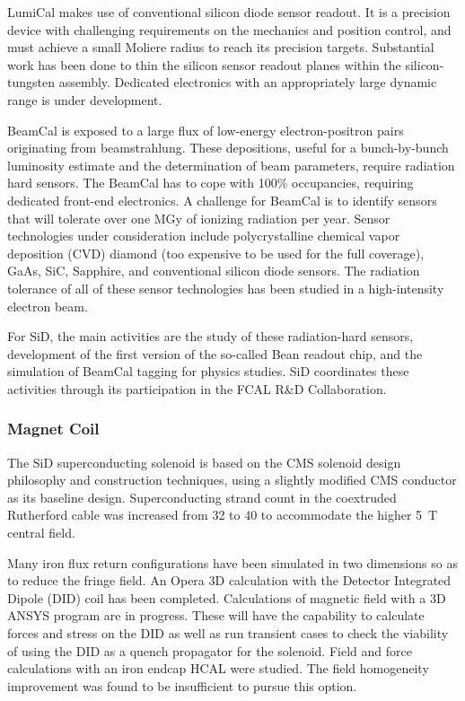 LumiCal makes use of conventional silicon diode sensor readout. It is a precision device with challenging requirements on the mechanics and position control, and must achieve a small Moliere radius to reach its precision targets. Substantial work has been done to thin the silicon sensor readout planes within the silicon-tungsten assembly. Dedicated electronics with an appropriately large dynamic range is under development.

BeamCal is exposed to a large flux of low-energy electron-positron pairs originating from beamstrahlung. These depositions, useful for a bunch-by-bunch luminosity estimate and the determination of beam parameters, require radiation hard sensors. The BeamCal has to cope with 100\% occupancies, requiring dedicated front-end electronics. A challenge for BeamCal is to identify sensors that will tolerate over one MGy of ionizing radiation per year. Sensor technologies under consideration include polycrystalline chemical vapor deposition (CVD) diamond (too expensive to be used for the full coverage), GaAs, SiC, Sapphire, and conventional silicon diode sensors. The radiation tolerance of all of these sensor technologies has been studied in a high-intensity electron beam. 

For SiD, the main activities are the study of these radiation-hard sensors, development of the first version of the so-called Bean readout chip, and the simulation of BeamCal tagging for physics studies. SiD coordinates these activities through its participation in the FCAL R\&D Collaboration.

\subsubsection{Magnet Coil}

The SiD superconducting solenoid is based on the CMS solenoid
design philosophy and construction techniques, using a slightly modified CMS
conductor as its baseline design. Superconducting strand count in the coextruded
Rutherford cable was increased from 32 to 40 to accommodate the higher 5~T
central field. 

Many iron flux return configurations have been simulated in two
dimensions so as to reduce the fringe field. An Opera 3D calculation with the Detector
Integrated Dipole (DID) coil has been completed.
Calculations of magnetic field with a 3D ANSYS program
are in progress. These will have the capability to calculate forces and stress
on the DID as well as run transient cases to check the viability of using the
DID as a quench propagator for the solenoid. Field and force calculations with
an iron endcap HCAL were studied. The field homogeneity improvement was found
to be insufficient to pursue this option. 

